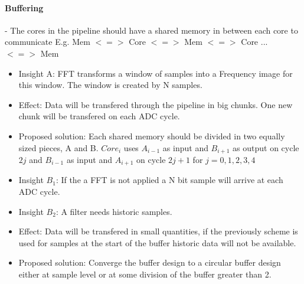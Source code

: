 \paragraph{Buffering}
 - The cores in the pipeline should have a shared memory in between each core to
 communicate
   E.g. Mem $<=>$ Core $<=>$ Mem $<=>$ Core ... $<=>$ Mem

\begin{itemize}
	\item Insight A: FFT transforms a window of samples into a Frequency image
for this window. The window is created by N samples.
  \item Effect: Data will be transfered through the pipeline in big chunks. One
new chunk will be transfered on each ADC cycle.
  \item Proposed solution: Each shared memory should be divided in two equally
sized pieces, A and B. $Core_i$ uses $A_{i-1}$ as input and $B_{i+1}$ as
output on cycle $2j$ and $B_{i-1}$ as input and $A_{i+1}$ on cycle $2j+1$ for
$j = 0,1,2,3,4$
\end{itemize}


\begin{itemize}
	\item Insight $B_1$: If the a FFT is not applied a N
	 bit sample
	will arrive at each ADC cycle.
  \item Insight $B_2$: A filter needs historic samples.
  \item Effect: Data will be transfered in small quantities, if the previously
scheme is used for samples at the start of the buffer historic data will not be
available.
  \item Proposed solution: Converge the buffer design to a circular buffer
design either at sample level or at some division of the buffer greater than 2.
\end{itemize}


